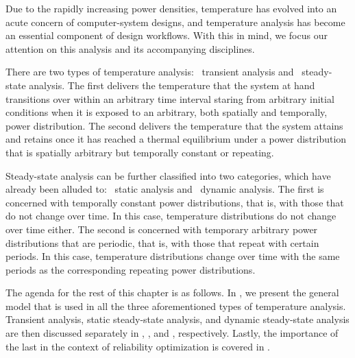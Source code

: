 Due to the rapidly increasing power densities, temperature has evolved into an
acute concern of computer-system designs, and temperature analysis has become an
essential component of design workflows. With this in mind, we focus our
attention on this analysis and its accompanying disciplines.

There are two types of temperature analysis: \one~transient analysis and
\two~steady-state analysis. The first delivers the temperature that the system
at hand transitions over within an arbitrary time interval staring from
arbitrary initial conditions when it is exposed to an arbitrary, both spatially
and temporally, power distribution. The second delivers the temperature that the
system attains and retains once it has reached a thermal equilibrium under a
power distribution that is spatially arbitrary but temporally constant or
repeating.

Steady-state analysis can be further classified into two categories, which have
already been alluded to: \one~static analysis and \two~dynamic analysis. The
first is concerned with temporally constant power distributions, that is, with
those that do not change over time. In this case, temperature distributions do
not change over time either. The second is concerned with temporary arbitrary
power distributions that are periodic, that is, with those that repeat with
certain periods. In this case, temperature distributions change over time with
the same periods as the corresponding repeating power distributions.

The agenda for the rest of this chapter is as follows. In
, we present the general model that is used in all the
three aforementioned types of temperature analysis. Transient analysis, static
steady-state analysis, and dynamic steady-state analysis are then discussed
separately in , ,
and , respectively. Lastly, the importance
of the last in the context of reliability optimization is covered in
.
